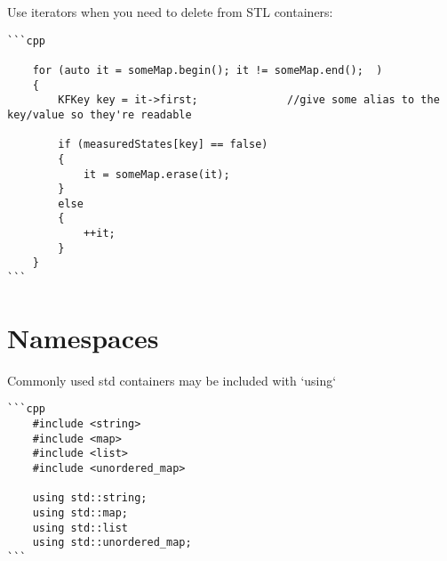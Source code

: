 Use iterators when you need to delete from STL containers:
\begin{verbatim}
```cpp

    for (auto it = someMap.begin(); it != someMap.end();  )
    {
        KFKey key = it->first;				//give some alias to the key/value so they're readable

        if (measuredStates[key] == false)
        {
	    	it = someMap.erase(it);
    	}
	    else
	    {
	    	++it;
    	}
    }
```
\end{verbatim}
\section{Namespaces}

Commonly used std containers may be included with `using`
\begin{verbatim}
```cpp
    #include <string>
    #include <map>
    #include <list>
    #include <unordered_map>
    
    using std::string;
    using std::map;
    using std::list
    using std::unordered_map;
```
\end{verbatim}